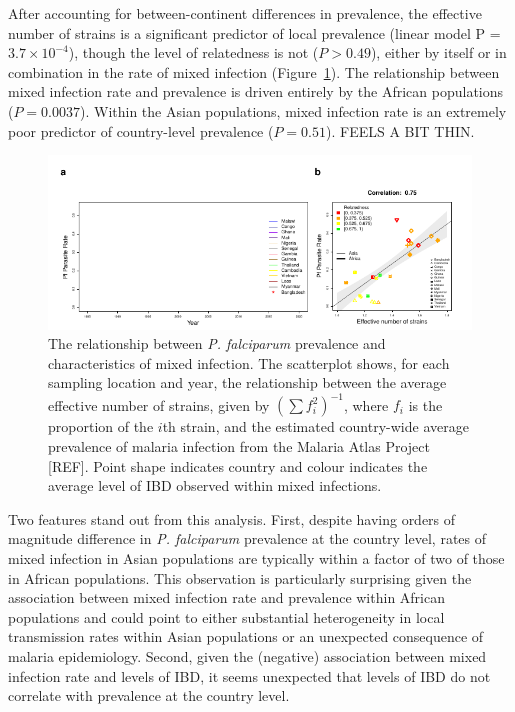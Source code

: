 \documentclass[9pt,lineno]{elife}
\begin{document}
After accounting for between-continent differences in prevalence, the effective number of strains is a significant predictor of local prevalence (linear model P = $3.7 \times 10^{-4}$), though the level of relatedness is not ($P>0.49$), either by itself or in combination in the rate of mixed infection (Figure~\ref{fig:pfpr}).  The relationship between mixed infection rate and prevalence is  driven entirely by the African populations ($P = 0.0037$).  Within the Asian populations, mixed infection rate is an extremely poor predictor of country-level prevalence ($P = 0.51$). FEELS A BIT THIN.

\begin{figure}[ht]
  \centering{}
    \includegraphics[width=\textwidth]{Fig4.pdf}
  \caption{The relationship between {\it P. falciparum} prevalence and characteristics of mixed infection.  The scatterplot shows, for each sampling location and year, the relationship between the average effective number of strains, given by $(\sum f_i^2)^{-1}$, where $f_i$ is the proportion of the $i$th strain, and the estimated country-wide average prevalence of malaria infection from the Malaria Atlas Project [REF].  Point shape indicates country and colour indicates the average level of IBD observed within mixed infections. }
  \label{fig:pfpr}
\end{figure}

Two features stand out from this analysis.  First, despite having orders of magnitude difference in {\it P. falciparum} prevalence at the country level, rates of mixed infection in Asian populations are typically within a factor of two of those in African populations.  This observation is particularly surprising given the association between mixed infection rate and prevalence within African populations and could point to either substantial heterogeneity in local transmission rates within Asian populations or an unexpected consequence of malaria epidemiology.  Second, given the (negative) association between mixed infection rate and levels of IBD, it seems unexpected that levels of IBD do not correlate with prevalence at the country level.
\end{document}
